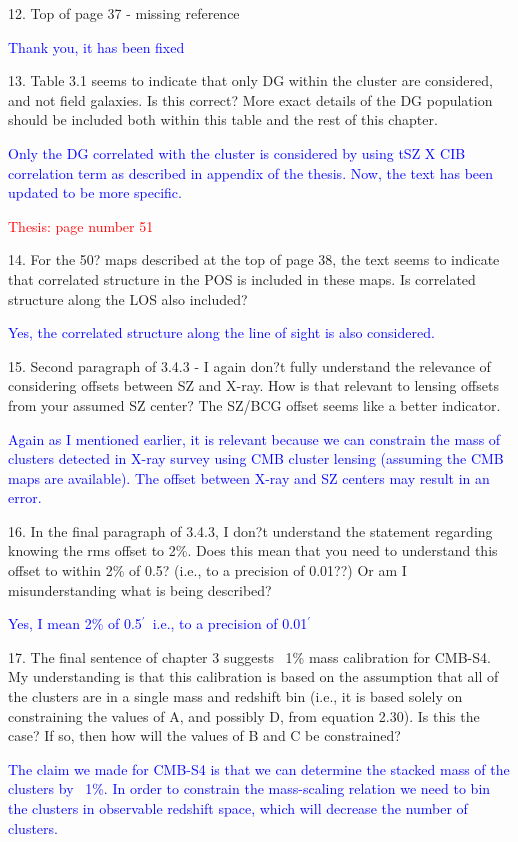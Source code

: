 \documentclass[11pt,a4paper]{article}
\newcommand{\am}{$^{\prime}$}
\begin{document}
12. Top of page 37 - missing reference

\textcolor{blue}{Thank you, it has been fixed}

13. Table 3.1 seems to indicate that only DG within the cluster are considered, and
not field galaxies. Is this correct? More exact details of the DG population should
be included both within this table and the rest of this chapter.

\textcolor{blue}{Only the DG correlated with the cluster is considered by using tSZ X CIB correlation term as described in appendix of the thesis. Now, the text has been updated to be more specific.}

\textcolor{red}{Thesis: page number 51}

14. For the 50? maps described at the top of page 38, the text seems to indicate that
correlated structure in the POS is included in these maps. Is correlated structure
along the LOS also included?

\textcolor{blue}{Yes, the correlated structure along the line of sight is also considered.}


15. Second paragraph of 3.4.3 - I again don?t fully understand the relevance of
considering offsets between SZ and X-ray. How is that relevant to lensing offsets
from your assumed SZ center? The SZ/BCG offset seems like a better indicator.

\textcolor{blue}{Again as I mentioned earlier, it is relevant because we can constrain the mass of clusters detected in X-ray survey using CMB cluster lensing (assuming the CMB maps are available). The offset between X-ray and SZ centers may result in an error.}

16. In the final paragraph of 3.4.3, I don?t understand the statement regarding
knowing the rms offset to 2\%. Does this mean that you need to understand this
offset to within 2\% of 0.5? (i.e., to a precision of 0.01??) Or am I misunderstanding
what is being described?

\textcolor{blue}{Yes, I mean 2\% of 0.5\am\ i.e., to a precision of 0.01\am}


17. The final sentence of chapter 3 suggests ~1\% mass calibration for CMB-S4. My
understanding is that this calibration is based on the assumption that all of the
clusters are in a single mass and redshift bin (i.e., it is based solely on
constraining the values of A, and possibly D, from equation 2.30). Is this the
case? If so, then how will the values of B and C be constrained?

\textcolor{blue}{The claim we made for CMB-S4 is that we can determine the stacked mass of the clusters by ~1\%. In order to constrain the mass-scaling relation we need to bin the clusters in observable redshift space, which will decrease the number of clusters. }
\end{document}
